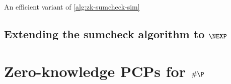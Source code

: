 \documentclass[english]{reedthesis}
\theoremstyle{plain}
\theoremstyle{definition}
\theoremstyle{remark}
\begin{document}
\begin{algorithm}[H]
  \caption{An efficient variant of
    \cref{alg:zk-sumcheck-sim}~\cite[p.\ 15:34]{CFGS22}}\label{alg:zk-sumcheck-fast}
\end{algorithm}


\section{Extending the sumcheck algorithm to $\NEXP$}

\chapter{Zero-knowledge PCPs for $\#\P$}\label{chap:zk-pcp-for-hp}
\end{document}
